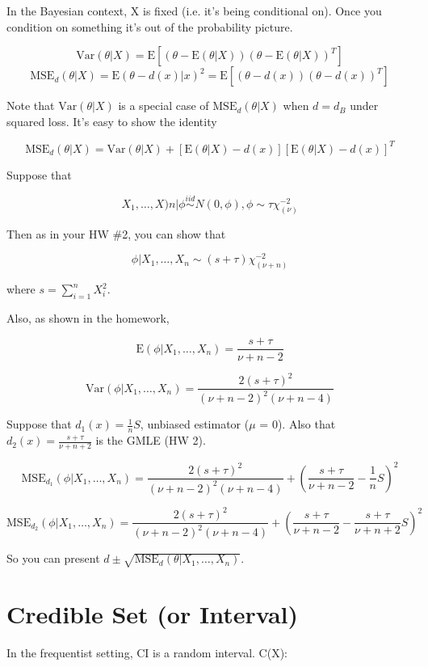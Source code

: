 \documentclass[11pt,fleqn]{book} %
\newcommand{\E}{\mathrm{E}}
\newcommand{\Var}{\mathrm{Var}}
\newcommand{\MSE}{\mathrm{MSE}}
\begin{document}
In the Bayesian context, X is fixed (i.e. it's being conditional on). Once you condition on something it's out of the probability picture. 

		$$\Var(\theta|X) = \E[(\theta - \E(\theta|X))(\theta- \E(\theta|X))^T]$$
		$$\MSE_d(\theta|X) = \E(\theta - d(x)|x)^2 = \E [(\theta - d(x))(\theta - d(x))^T] $$

Note that $\Var(\theta|X)$ is a special case of $\MSE_d(\theta|X)$ when $d = d_B$ under squared loss. It's easy to show the identity 

		$$\MSE_d(\theta|X) = \Var(\theta|X) + [\E(\theta|X) - d(x)][\E(\theta|X) - d(x)]^T $$

\begin{example}
	Suppose that

			$$X_1, \dots, X)n|\phi \stackrel{iid}{\sim} N(0, \phi), \phi\sim \tau \chi^{-2}_{(\nu)}$$

	Then as in your HW \#2, you can show that 

			$$\phi | X_1, \dots, X_n \sim (s + \tau) \chi^{-2}_{(\nu + n)} $$



	where $s = \sum^n_{i=1} X_i^2$. 

	Also, as shown in the homework, 

			$$\E(\phi|X_1, \dots, X_n) = \frac{s+ \tau}{\nu + n - 2} $$

			$$\Var(\phi|X_1, \dots, X_n) = \frac{2(s+ \tau)^2}{(\nu + n - 2 )^2 (\nu + n - 4)} $$

	Suppose that $d_1(x) = \frac{1}{n} S$, unbiased estimator ($\mu$ = 0). Also that $d_2(x) = \frac{s + \tau}{\nu + n +2}$ is the GMLE (HW 2). 

			$$\MSE_{d_1}(\phi|X_1, \dots, X_n) = \frac{2(s + \tau)^2}{(\nu + n - 2)^2 (\nu + n - 4)} + \left(\frac{s + \tau}{\nu + n - 2} - \frac{1}{n}S\right)^2 $$

			$$\MSE_{d_2}(\phi|X_1, \dots, X_n) = \frac{2(s + \tau)^2}{(\nu + n - 2)^2 (\nu + n - 4)} + \left(\frac{s + \tau}{\nu + n - 2} - \frac{s + \tau}{\nu + n + 2}S\right)^2 $$

	So you can present $d \pm \sqrt{\MSE_d (\theta | X_1, \dots, X_n)}$. 
\end{example}

\section{Credible Set (or Interval)}

In the frequentist setting, CI is a random interval. C(X):
\end{document}

